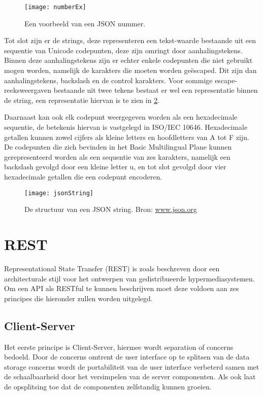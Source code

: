 \begin{figure}[H]
    \centering
    \texttt{[image: numberEx]}
    \caption[JSON Nummer]{Een voorbeeld van een JSON nummer.}
    \label{fig:numberEx}
\end{figure}

Tot slot zijn er de strings, deze representeren een tekst-waarde bestaande uit een sequentie van Unicode codepunten, deze zijn omringt door aanhalingstekens. Binnen deze aanhalingstekens zijn er echter enkele codepunten die niet gebruikt mogen worden, namelijk de karakters die moeten worden geëscaped. Dit zijn dan aanhalingstekens, backslash en de control karakters.
Voor sommige escape-reeksweergaven bestaande uit twee tekens bestaat er wel een representatie binnen de string, een representatie hiervan is te zien in \ref{fig:jsonString}.

Daarnaast kan ook elk codepunt weergegeven worden als een hexadecimale sequentie, de betekenis hiervan is vastgelegd in ISO/IEC 10646. Hexadecimale getallen kunnen zowel cijfers als kleine letters en hoofdletters van A tot F zijn.
De codepunten die zich bevinden in het Basic Multilingual Plane kunnen gerepresenteerd worden als een sequentie van zes karakters, namelijk een backslash gevolgd door een kleine letter u, en tot slot gevolgd door vier hexadecimale getallen die een codepunt encoderen.

\begin{figure}[H]
    \centering
    \texttt{[image: jsonString]}
    \caption[JSON String]{De structuur van een JSON string. Bron: \url{www.json.org}}
    \label{fig:jsonString}
\end{figure}


\section{REST}
\label{sec:REST}

Representational State Transfer (REST) is zoals beschreven door \textcite{Fielding2000} een architecturale stijl voor het ontwerpen van gedistribueerde hypermediasystemen. Om een API als RESTful te kunnen beschrijven moet deze voldoen aan zes principes die hieronder zullen worden uitgelegd. 

\subsection{Client-Server}
\label{subsec:Client-Server}

Het eerste principe is Client-Server, hiermee wordt separation of concerns bedoeld. Door de concerns omtrent de user interface op te splitsen van de data storage concerns wordt de portabiliteit van de user interface verbeterd samen met de schaalbaarheid door het versimpelen van de server componenten. Als ook laat de opsplitsing toe dat de componenten zelfstandig kunnen groeien.
